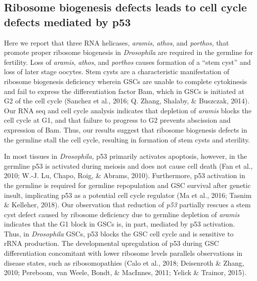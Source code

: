 \documentclass[12pt,oneside]{reedthesis}
\begin{document}
\hypertarget{ribosome-biogenesis-defects-leads-to-cell-cycle-defects-mediated-by-p53}{%
\subsection{Ribosome biogenesis defects leads to cell cycle defects mediated by p53}\label{ribosome-biogenesis-defects-leads-to-cell-cycle-defects-mediated-by-p53}}

Here we report that three RNA helicases, \emph{aramis}, \emph{athos}, and
\emph{porthos,} that promote proper ribosome biogenesis in \emph{Drosophila} are
required in the germline for fertility. Loss of \emph{aramis}, \emph{athos}, and
\emph{porthos} causes formation of a ``stem cyst'' and loss of later stage
oocytes. Stem cysts are a characteristic manifestation of ribosome
biogenesis deficiency wherein GSCs are unable to complete cytokinesis
and fail to express the differentiation factor Bam, which in GSCs is
initiated at G2 of the cell cycle (Sanchez et al., 2016; Q. Zhang, Shalaby, \& Buszczak, 2014). Our
RNA seq and cell cycle analysis indicates that depletion of \emph{aramis}
blocks the cell cycle at G1, and that failure to progress to G2 prevents
abscission and expression of Bam. Thus, our results suggest that
ribosome biogenesis defects in the germline stall the cell cycle,
resulting in formation of stem cysts and sterility.

In most tissues in \emph{Drosophila,} p53 primarily activates apoptosis,
however, in the germline p53 is activated during meiosis and does not
cause cell death (Fan et al., 2010; W.-J. Lu, Chapo, Roig, \& Abrams, 2010). Furthermore, p53 activation in
the germline is required for germline repopulation and GSC survival
after genetic insult, implicating p53 as a potential cell cycle
regulator (Ma et al., 2016; Tasnim \& Kelleher, 2018). Our
observation that reduction of \emph{p53} partially rescues a stem cyst defect
caused by ribosome deficiency due to germline depletion of \emph{aramis}
indicates that the G1 block in GSCs is, in part, mediated by p53
activation. Thus, in \emph{Drosophila} GSCs, p53 blocks the GSC cell cycle
and is sensitive to rRNA production. The developmental upregulation of
p53 during GSC differentiation concomitant with lower ribosome levels
parallels observations in disease states, such as ribosomopathies
(Calo et al., 2018; Deisenroth \& Zhang, 2010; Pereboom, van Weele, Bondt, \& MacInnes, 2011; Yelick \& Trainor, 2015).
\end{document}
